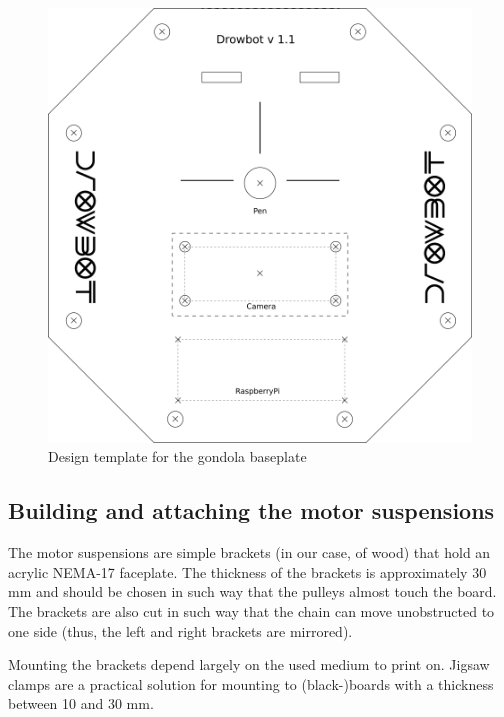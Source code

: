 \documentclass[a4paper,10pt]{article}
\begin{document}
\begin{figure}[h!]
  \centering
  \includegraphics{img/gondola.png}
  \caption{Design template for the gondola baseplate}
  \label{fig:baseplate}
\end{figure}

\subsection{Building and attaching the motor suspensions}

The motor suspensions are simple brackets (in our case, of wood) that hold an acrylic NEMA-17 faceplate. The thickness of the brackets is approximately 30 mm and should be chosen in such way that the pulleys almost touch the board. The brackets are also cut in such way that the chain can move unobstructed to one side (thus, the left and right brackets are mirrored).

Mounting the brackets depend largely on the used medium to print on. Jigsaw clamps are a practical solution for mounting to (black-)boards with a thickness between 10 and 30 mm.
\end{document}
